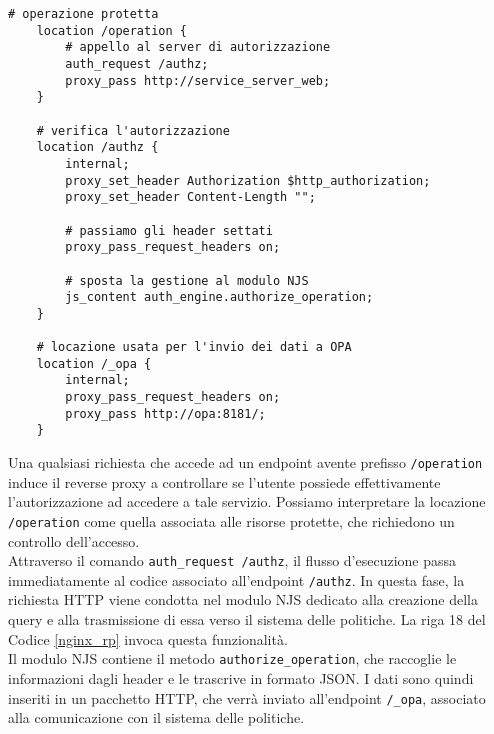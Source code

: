 \lstset{language=nginx}
\begin{lstlisting}[caption={Frammento di codice del reverse proxy},captionpos=b,label=nginx_rp]
    # operazione protetta
    location /operation {
        # appello al server di autorizzazione
        auth_request /authz; 
        proxy_pass http://service_server_web;
    }

    # verifica l'autorizzazione
    location /authz {
        internal;
        proxy_set_header Authorization $http_authorization;
        proxy_set_header Content-Length "";

        # passiamo gli header settati
        proxy_pass_request_headers on; 

        # sposta la gestione al modulo NJS  
        js_content auth_engine.authorize_operation;
    }

    # locazione usata per l'invio dei dati a OPA
    location /_opa {
        internal;
        proxy_pass_request_headers on; 
        proxy_pass http://opa:8181/;
    }
\end{lstlisting}
Una qualsiasi richiesta che accede ad un endpoint avente prefisso \texttt{/operation} induce il reverse proxy a controllare 
se l'utente possiede effettivamente l'autorizzazione ad accedere a tale servizio. Possiamo interpretare la locazione \texttt{/operation}
come quella associata alle risorse protette, che richiedono un controllo dell'accesso. 
\\ Attraverso il comando \texttt{auth\_request /authz},
il flusso d'esecuzione passa immediatamente al codice associato all'endpoint \texttt{/authz}. 
In questa fase, la richiesta HTTP viene condotta nel modulo NJS dedicato alla creazione della query e alla trasmissione di essa verso il sistema delle politiche.
La riga 18 del Codice \ref*{nginx_rp} invoca questa funzionalità. \\
Il modulo NJS contiene il metodo \texttt{authorize\_operation}, che raccoglie le informazioni dagli header 
e le trascrive in formato JSON.
I dati sono quindi inseriti in un pacchetto HTTP, che verrà inviato all'endpoint \texttt{/\_opa}, 
 associato alla comunicazione con il sistema delle politiche.
\lstset{language=nginx}
